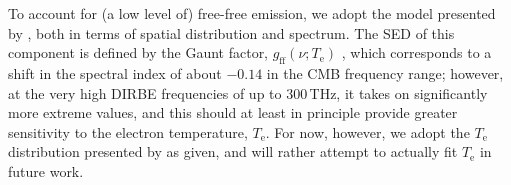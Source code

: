 \documentclass{aa}
\def\Planck{\textit{Planck}}
\def\GAIA{\textit{Gaia}}
\begin{document}

To account for (a low level of) free-free emission, we adopt the model presented by
\citet{planck2014-a11}, both in terms of spatial distribution and
spectrum. The SED of this component is defined by the Gaunt factor,
$g_{\mathrm{ff}}(\nu; T_\mathrm{e})$ \citep{dickinson:2003,draine:2011}, which
corresponds to a shift in the spectral index of about $-0.14$ in the
CMB frequency range; however, at the very high DIRBE frequencies of up
to 300\,THz, it takes on significantly more extreme values, and this
should at least in principle provide greater sensitivity to the
electron temperature, $T_\mathrm{e}$. For now, however, we adopt the $T_\mathrm{e}$
distribution presented by \citet{planck2014-a11} as given, and will
rather attempt to actually fit $T_\mathrm{e}$ in future work.
\end{document}
